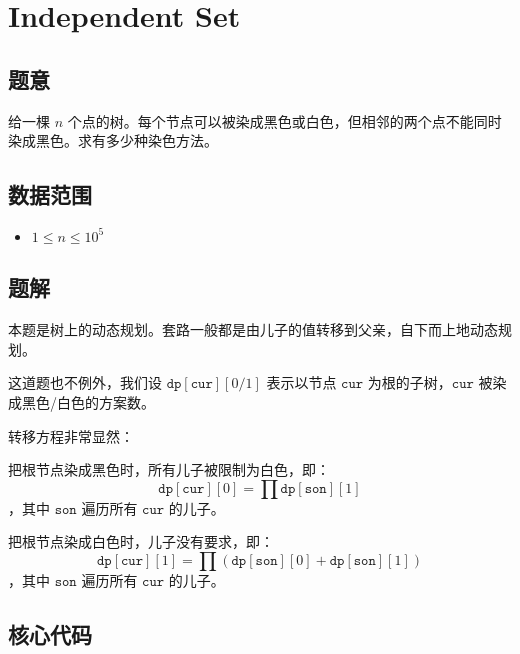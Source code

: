 \section{Independent Set}
\subsection*{题意}
给一棵 $n$ 个点的树。每个节点可以被染成黑色或白色，但相邻的两个点不能同时染成黑色。求有多少种染色方法。
\subsection*{数据范围}
\begin{itemize}
\item $1 \leq n \leq 10^5$
\end{itemize}

\subsection*{题解}

本题是树上的动态规划。套路一般都是由儿子的值转移到父亲，自下而上地动态规划。

这道题也不例外，我们设 $\texttt{dp}[\texttt{cur}][0/1]$ 表示以节点 $\texttt{cur}$ 为根的子树，$\texttt{cur}$ 被染成黑色/白色的方案数。

转移方程非常显然：

把根节点染成黑色时，所有儿子被限制为白色，即：
$$
\texttt{dp}[\texttt{cur}][0] = \prod \texttt{dp}[\texttt{son}][1] 
$$
，其中 $\texttt{son}$ 遍历所有 $\texttt{cur}$ 的儿子。

把根节点染成白色时，儿子没有要求，即：
$$
\texttt{dp}[\texttt{cur}][1]= \prod (\texttt{dp}[\texttt{son}][0] + \texttt{dp}[\texttt{son}][1])
$$
，其中 $\texttt{son}$ 遍历所有 $\texttt{cur}$ 的儿子。

\subsection*{核心代码}
\inputminted[linenos,autogobble]{cpp}{./Code/P.cpp}
\newpage